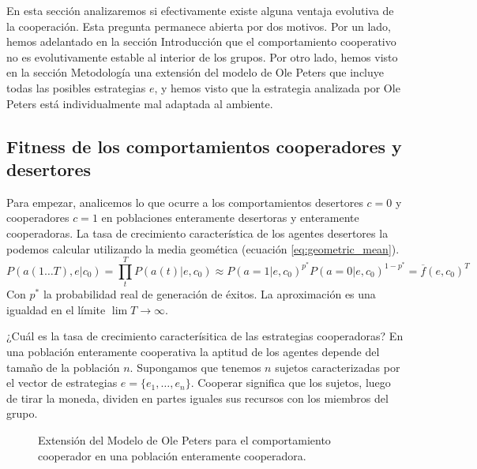 \documentclass[a4paper,10pt]{article}
\begin{document}
En esta sección analizaremos si efectivamente existe alguna ventaja evolutiva de la cooperación.
Esta pregunta permanece abierta por dos motivos.
Por un lado, hemos adelantado en la sección Introducción que el comportamiento cooperativo no es evolutivamente estable al interior de los grupos.
Por otro lado, hemos visto en la sección Metodología una extensión del modelo de Ole Peters que incluye todas las posibles estrategias $e$, y hemos visto que la estrategia analizada por Ole Peters está individualmente mal adaptada al ambiente.

\subsection{Fitness de los comportamientos cooperadores y desertores}

Para empezar, analicemos lo que ocurre a los comportamientos desertores $c=0$ y cooperadores $c=1$ en poblaciones enteramente desertoras y enteramente cooperadoras.
La tasa de crecimiento característica de los agentes desertores la podemos calcular utilizando la media geomética (ecuación \ref{eq:geometric_mean}).
%
\begin{equation}\label{eq:des_temporal_average}
P(a(1\dots T), e | c_0) = \prod_t^T P(a(t)|e,c_0) \approx  P(a=1|e,c_0)^{p^*} P(a=0|e,c_0)^{1-p^*} = \overline{f}(e,c_0)^T
\end{equation}
%
Con $p^*$ la probabilidad real de generación de éxitos.
La aproximación es una igualdad en el límite $\lim T \rightarrow \infty$.


¿Cuál es la tasa de crecimiento caracterísitica de las estrategias cooperadoras?
En una población enteramente cooperativa la aptitud de los agentes depende del tamaño de la población $n$.
Supongamos que tenemos $n$ sujetos caracterizadas por el vector de estrategias $e = \{e_1, \dots, e_n\}$.
Cooperar significa que los sujetos, luego de tirar la moneda, dividen en partes iguales sus recursos con los miembros del grupo.
%
\begin{figure}[H]
\centering
{}
\caption{Extensión del Modelo de Ole Peters para el comportamiento cooperador en una población enteramente cooperadora.}
\label{fig:modelo_cooperativo}
\end{figure}
%
\end{document}
